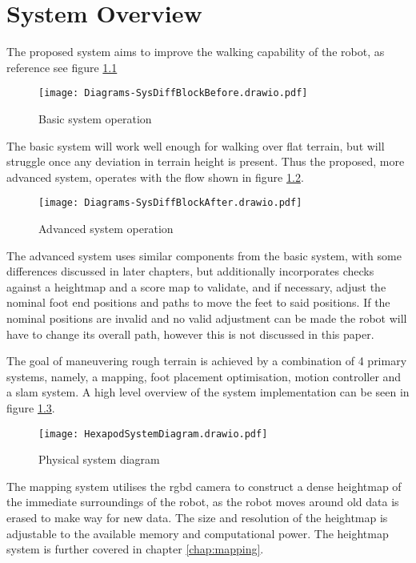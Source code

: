 \chapter{System Overview}
The proposed system aims to improve the walking capability of the robot, as reference see figure \ref{fig:basic_sys}
\begin{figure}[h]
    \centering
    \texttt{[image: Diagrams-SysDiffBlockBefore.drawio.pdf]}
    \caption{Basic system operation}
    \label{fig:basic_sys}
\end{figure}

\noindent
The basic system will work well enough for walking over flat terrain, but will struggle once any
deviation in terrain height is present. Thus the proposed, more advanced system, operates with the flow shown in figure \ref{fig:adv_sys}.
\begin{figure}[h]
    \centering
    \texttt{[image: Diagrams-SysDiffBlockAfter.drawio.pdf]}
    \caption{Advanced system operation}
    \label{fig:adv_sys}
\end{figure}

\noindent
The advanced system uses similar components from the basic system, with some differences discussed in
later chapters, but additionally incorporates checks against a heightmap and a score map to validate, and if necessary, adjust the nominal foot 
end positions and paths to move the feet to said positions. If the nominal positions are invalid and no valid adjustment can be made the 
robot will have to change its overall path, however this is not discussed in this paper.

The goal of maneuvering rough terrain is achieved by a combination of 4 primary systems, namely, a mapping, 
foot placement optimisation, motion controller and a \ac*{slam} system. A high level overview of the system implementation can be seen
in figure \ref{fig:system_diagram}.
\begin{figure}[h]
    \centering
    \texttt{[image: HexapodSystemDiagram.drawio.pdf]}
    \caption{Physical system diagram}
    \label{fig:system_diagram}
\end{figure}

The mapping system utilises the \ac*{rgbd} camera to construct a dense heightmap of the immediate surroundings of the robot, as the robot moves around old data is erased to make
way for new data. The size and resolution of the heightmap is adjustable to the available memory and computational power. The heightmap system is further covered in chapter \ref{chap:mapping}.

